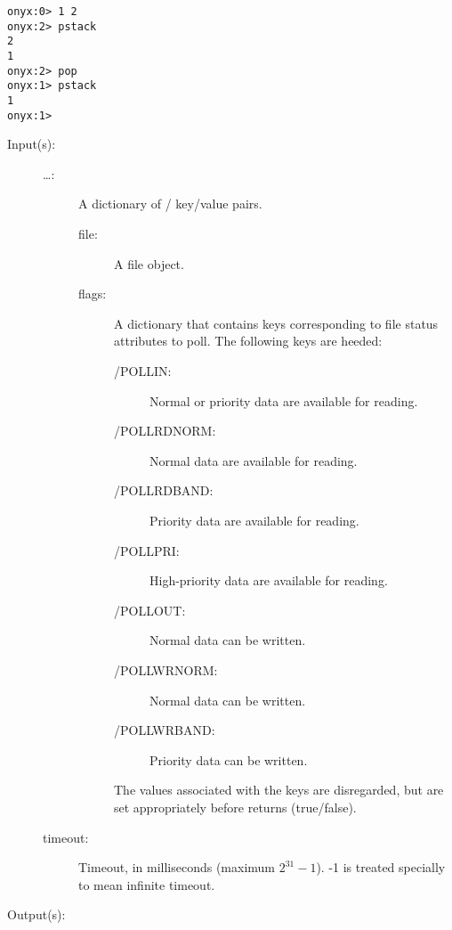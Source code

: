 \begin{description}
\begin{description}
\begin{verbatim}
onyx:0> 1 2
onyx:2> pstack
2
1
onyx:2> pop
onyx:1> pstack
1
onyx:1>
		\end{verbatim}
	\end{description}
\label{systemdict:poll}
\item[{\onyxop{{\lt}file flags \dots{\gt} timeout}{poll}{{\lb}file
      \dots{\rb}}}: ]
	\begin{description}\item[]
	\item[Input(s): ]
		\begin{description}\item[]
		\item[{\lt}\dots{\gt}: ]
			A dictionary of / key/value
			pairs.
			\begin{description}\item[]
			\item[file: ]
				A file object.
			\item[flags: ]
				A dictionary that contains keys corresponding to
				file status attributes to poll.  The following
				keys are heeded:
				\begin{description}\item[]
				\item[/POLLIN: ]
					Normal or priority data are available
					for reading.
				\item[/POLLRDNORM: ]
					Normal data are available for reading.
				\item[/POLLRDBAND: ]
					Priority data are available for reading.
				\item[/POLLPRI: ]
					High-priority data are available for
					reading.
				\item[/POLLOUT: ]
					Normal data can be written.
				\item[/POLLWRNORM: ]
					Normal data can be written.
				\item[/POLLWRBAND: ]
					Priority data can be written.
				\end{description}
				The values associated with the keys are
				disregarded, but are set appropriately before
				 returns (true/false).
			\end{description}
		\item[timeout: ]
			Timeout, in milliseconds (maximum $2^{31} - 1$).  -1 is
			treated specially to mean infinite timeout.
		\end{description}
	\item[Output(s): ]
		\begin{description}\item[]

\end{description}
\end{description}
\end{description}
